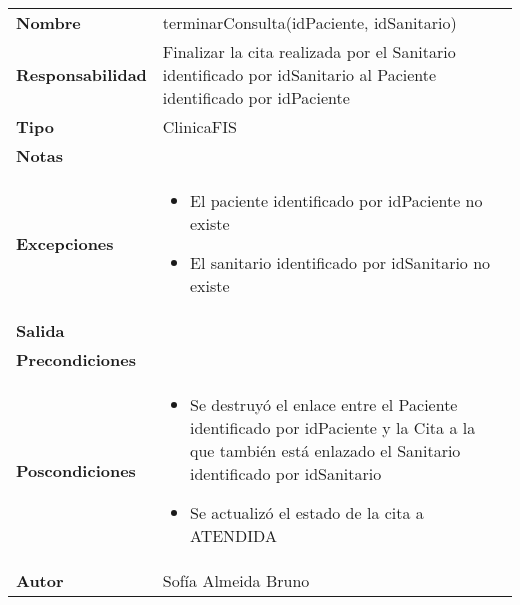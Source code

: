 \documentclass[11pt,a4paper]{article}
\begin{document}
\begin{table}[H]
\centering
\label{my-label}
\begin{tabularx}{\textwidth}{l|X}
\textbf{Nombre}          & terminarConsulta(idPaciente, idSanitario) \\
\textbf{Responsabilidad} & Finalizar la cita realizada por el Sanitario identificado por idSanitario al Paciente identificado por idPaciente\\
\textbf{Tipo}            & ClinicaFIS \\
\textbf{Notas}           &  \\
\textbf{Excepciones}     & 
\begin{itemize}
\item El paciente identificado por idPaciente no existe
\item El sanitario identificado por idSanitario no existe
\end{itemize}\\
\textbf{Salida}          &  \\
\textbf{Precondiciones}  &  \\
\textbf{Poscondiciones}  & \begin{itemize}
\item Se destruyó el enlace entre el Paciente identificado por idPaciente y la Cita a la que también está enlazado el Sanitario identificado por idSanitario
\item Se actualizó el estado de la cita a ATENDIDA
\end{itemize}\\
\textbf{Autor}           & Sofía Almeida Bruno
\end{tabularx}
\end{table}
\end{document}
